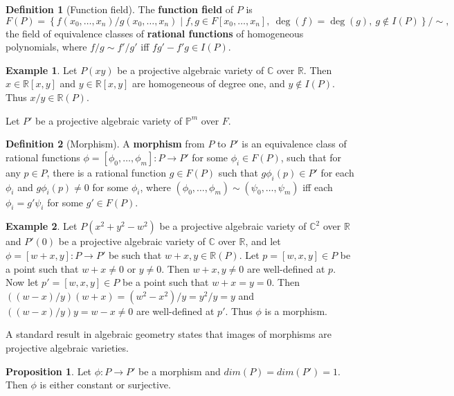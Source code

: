 \documentclass{article}
\newcommand{\R}{\mathbb{R}}
\newcommand{\C}{\mathbb{C}}
\renewcommand{\P}{\mathbb{P}}
\newcommand{\rb}[1]{\left( #1 \right)}
\renewcommand{\sb}[1]{\left[ #1 \right]}
\newcommand{\cb}[1]{\left\{ #1 \right\}}
\theoremstyle{definition}
\newtheorem*{definition}{Definition}
\newtheorem*{example}{Example}
\newtheorem{proposition}{Proposition}[subsection]
\begin{document}
\begin{definition}[Function field]
The \textbf{function field} of $ P $ is
$$ F\rb{P} = \cb{f\rb{x_0, \dots, x_n} / g\rb{x_0, \dots, x_n} \mid f, g \in F\sb{x_0, \dots, x_n}, \ \deg\rb{f} = \deg\rb{g}, \ g \notin I\rb{P}} / \sim, $$
the field of equivalence classes of \textbf{rational functions} of homogeneous polynomials, where $ f / g \sim f' / g' $ iff $ fg' - f'g \in I\rb{P} $.
\end{definition}

\begin{example}
Let $ P\rb{xy} $ be a projective algebraic variety of $ \C $ over $ \R $. Then $ x \in \R\sb{x, y} $ and $ y \in \R\sb{x, y} $ are homogeneous of degree one, and $ y \notin I\rb{P} $. Thus $ x / y \in \R\rb{P} $.
\end{example}

Let $ P' $ be a projective algebraic variety of $ \P^m $ over $ F $.

\begin{definition}[Morphism]
A \textbf{morphism} from $ P $ to $ P' $ is an equivalence class of rational functions $ \phi = \sb{\phi_0, \dots, \phi_m} : P \to P' $ for some $ \phi_i \in F\rb{P} $, such that for any $ p \in P $, there is a rational function $ g \in F\rb{P} $ such that $ g\phi_i\rb{p} \in P' $ for each $ \phi_i $ and $ g\phi_i\rb{p} \ne 0 $ for some $ \phi_i $, where $ \rb{\phi_0, \dots, \phi_m} \sim \rb{\psi_0, \dots, \psi_m} $ iff each $ \phi_i = g'\psi_i $ for some $ g' \in F\rb{P} $.
\end{definition}

\begin{example}
Let $ P\rb{x^2 + y^2 - w^2} $ be a projective algebraic variety of $ \C^2 $ over $ \R $ and $ P'\rb{0} $ be a projective algebraic variety of $ \C $ over $ \R $, and let $ \phi = \sb{w + x, y} : P \to P' $ be such that $ w + x, y \in \R\rb{P} $. Let $ p = \sb{w, x, y} \in P $ be a point such that $ w + x \ne 0 $ or $ y \ne 0 $. Then $ w + x, y \ne 0 $ are well-defined at $ p $. Now let $ p' = \sb{w, x, y} \in P $ be a point such that $ w + x = y = 0 $. Then $ \rb{\rb{w - x} / y}\rb{w + x} = \rb{w^2 - x^2} / y = y^2 / y = y $ and $ \rb{\rb{w - x} / y}y = w - x \ne 0 $ are well-defined at $ p' $. Thus $ \phi $ is a morphism.
\end{example}

A standard result in algebraic geometry states that images of morphisms are projective algebraic varieties.

\begin{proposition}
Let $ \phi : P \to P' $ be a morphism and $ dim\rb{P} = dim\rb{P'} = 1 $. Then $ \phi $ is either constant or surjective.
\end{proposition}
\end{document}
